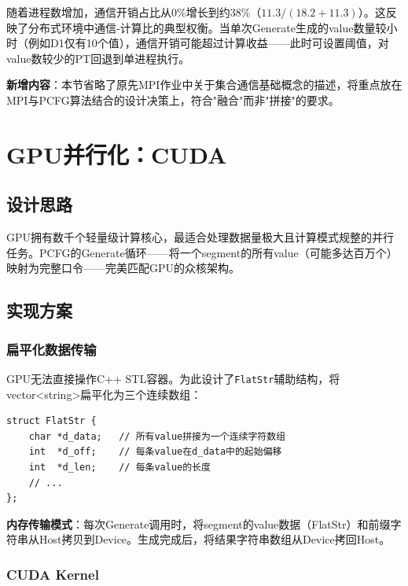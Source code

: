 \documentclass[12pt,a4paper]{ctexart}
\begin{document}
随着进程数增加，通信开销占比从0\%增长到约38\%（$11.3/(18.2+11.3)$）。这反映了分布式环境中通信-计算比的典型权衡。当单次Generate生成的value数量较小时（例如D1仅有10个值），通信开销可能超过计算收益——此时可设置阈值，对value数较少的PT回退到单进程执行。

\textbf{新增内容}：本节省略了原先MPI作业中关于集合通信基础概念的描述，将重点放在MPI与PCFG算法结合的设计决策上，符合"融合"而非"拼接"的要求。

\section{GPU并行化：CUDA}

\subsection{设计思路}

GPU拥有数千个轻量级计算核心，最适合处理数据量极大且计算模式规整的并行任务。PCFG的Generate循环——将一个segment的所有value（可能多达百万个）映射为完整口令——完美匹配GPU的众核架构。

\subsection{实现方案}

\subsubsection{扁平化数据传输}

GPU无法直接操作C++ STL容器。为此设计了\texttt{FlatStr}辅助结构，将vector<string>扁平化为三个连续数组：

\begin{lstlisting}[caption={FlatStr — 向量字符串的GPU可访问表示},label=lst:flatstr]
struct FlatStr {
    char *d_data;   // 所有value拼接为一个连续字符数组
    int  *d_off;    // 每条value在d_data中的起始偏移
    int  *d_len;    // 每条value的长度
    // ...
};
\end{lstlisting}

\textbf{内存传输模式}：每次Generate调用时，将segment的value数据（FlatStr）和前缀字符串从Host拷贝到Device。生成完成后，将结果字符串数组从Device拷回Host。

\subsubsection{CUDA Kernel}
\end{document}
